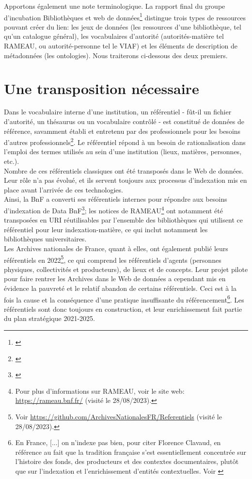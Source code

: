\documentclass[a4paper,12pt,twoside]{book}
\begin{document}
Apportons également une note terminologique. La rapport final du groupe d’incubation \og Bibliothèques et web de données\fg\footnote{\cite{bakerRapportFinalGroupe2012}} distingue trois types de ressources pouvant créer du lien: les jeux de données (les ressources d'une bibliothèque, tel qu'un catalogue général), les vocabulaires d'autorité (autorités-matière tel RAMEAU, ou autorité-personne tel le VIAF) et les éléments de description de métadonnées (les ontologies). Nous traiterons ci-dessous des deux premiers. 


\section{Une transposition nécessaire}

Dans le vocabulaire interne d'une institution, un référentiel - fût-il un fichier d'autorité, un thésaurus ou un vocabulaire contrôlé - est constitué de données de référence, savamment établi et entretenu par des professionnels pour les besoins d'autres professionnels\footnote{\cite[p.~43]{bermesWebSemantiqueBibliotheque2013}}. Le référentiel répond à un besoin de rationalisation dans l'emploi des termes utilisés au sein d'une institution (lieux, matières, personnes, etc.).\\

Nombre de ces référentiels \og classiques \fg{} ont été transposés dans le Web de données. Leur rôle n'a pas évolué, et ils servent toujours aux processus d'indexation mis en place avant l'arrivée de ces technologies.\\

Ainsi, la BnF a converti ses référentiels internes pour répondre aux besoins d'indexation de Data BnF\footnote{\cite{bibliothequenationaledefranceVocabulairesEmployesBibliotheque2023}}; les notices de RAMEAU\footnote{Pour plus d'informations sur RAMEAU, voir le site web: \url{https://rameau.bnf.fr/} (visité le 28/08/2023).} ont notamment été transposées en URI réutilisables par l'ensemble des bibliothèques qui utilisent ce référentiel pour leur indexation-matière, ce qui inclut notamment les bibliothèques universitaires.\\

Les Archives nationales de France, quant à elles, ont également publié leurs référentiels en 2022\footnote{Voir \url{https://github.com/ArchivesNationalesFR/Referentiels} (visité le 28/08/2023).}, ce qui comprend les référentiels d'agents (personnes physiques, collectivités et producteurs), de lieux et de concepts. Leur projet pilote pour faire rentrer les Archives dans le Web de données a cependant mis en évidence la pauvreté et le relatif abandon de certains référentiels. Ceci est à la fois la cause et la conséquence d'une pratique insuffisante du référencement\footnote{\og En France, [...] on n'indexe pas bien\fg, pour citer Florence Clavaud, en référence au fait que la tradition française s'est essentiellement concentrée sur l'histoire des fonds, des producteurs et des contextes documentaires, plutôt que sur l'indexation et l'enrichissement d'entités contextuelles. Voir \cite[18 min 45 sec] {clavaudRiCAuxArchives2022}}. Les référentiels sont donc toujours en construction, et leur enrichissement fait partie du plan stratégique 2021-2025. 
\end{document}
